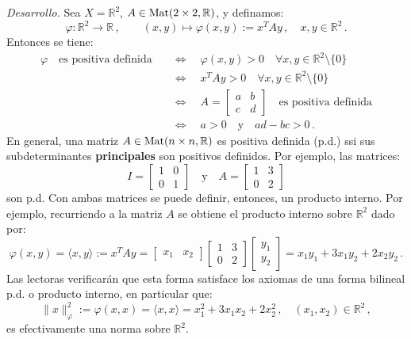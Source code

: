 \documentclass[12pt,reqno]{amsart}
\begin{document}
\smallskip\noindent
\emph{Desarrollo.}
Sea $X=\mathbb{R}^2$, $A\in{\rm Mat}(2\times 2,\mathbb{R})$, y definamos:
\begin{equation*}
\varphi: \mathbb{R}^2 \rightarrow \mathbb{R}\,,\qquad
(x,y)\mapsto \varphi(x,y):= x^{T}Ay\,,\quad x,y\in\mathbb{R}^2\,.
\end{equation*}
Entonces se tiene:
\begin{align*}
\varphi\quad\text{es positiva definida}\quad
& \Leftrightarrow\quad \varphi(x,y)> 0\quad
  \forall x,y\in\mathbb{R}^2\setminus\{0\} \\
& \Leftrightarrow\quad x^{T}Ay> 0\quad
  \forall x,y\in\mathbb{R}^2\setminus\{0\}\quad \\
& \Leftrightarrow\quad 
  A=\begin{bmatrix} a & b \\ c & d \end{bmatrix}\quad
  \text{es positiva definida} \\
& \Leftrightarrow\quad 
  a>0\quad\text{y}\quad ad-bc>0\,.
\end{align*}
En general, una matriz $A\in{\rm Mat}(n\times n,\mathbb{R})$
es positiva definida (p.d.) ssi sus subdeterminantes
{\color{red}\bf principales} son positivos definidos.
Por ejemplo, las matrices:
$$
I=\begin{bmatrix} 1 & 0 \\ 0 & 1 \end{bmatrix}
\quad\text{y}\quad 
A=\begin{bmatrix} 1 & 3 \\ 0 & 2 \end{bmatrix}
$$
son p.d.
Con ambas matrices se puede definir, entonces, un producto interno.
Por ejemplo, recurriendo a la matriz $A$ se obtiene el producto interno
sobre $\mathbb{R}^2$ dado por:
$$
\varphi(x,y) = \langle x,y\rangle := x^{T}Ay
= \begin{bmatrix} x_1 & x_2 \end{bmatrix}
  \begin{bmatrix} 1 & 3 \\ 0 & 2 \end{bmatrix}
  \begin{bmatrix} y_1 \\ y_2 \end{bmatrix}
= x_1y_1 + 3x_1 y_2 + 2 x_2 y_2\,.
$$
Las lectoras verificar\'an que esta forma satisface los axiomas de una
forma bilineal p.d. o producto interno, en particular que:
$$
\|x\|_\varphi^2 := \varphi(x,x) = \langle x,x\rangle
= x_1^2 + 3x_1 x_2 + 2 x_2^2\,,\quad (x_1,x_2)\in\mathbb{R}^2\,,
$$
es efectivamente una norma sobre $\mathbb{R}^2$.
\end{document}
